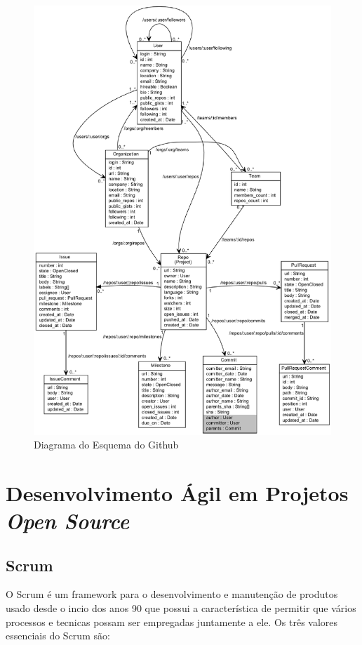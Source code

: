 \newpage
\begin{figure}[!h]
    \centering
        \includegraphics[width=\textwidth,height=\textheight,keepaspectratio=true]{figuras/gtschema.eps}
    \caption{Diagrama do Esquema do Github}
    \label{fig:github_api}
\end{figure}

\section{Desenvolvimento Ágil em Projetos \textit{Open Source}}
\label{red:des}

\subsection{Scrum}
O Scrum é um framework para o desenvolvimento e manutenção de produtos usado desde o incio dos anos 90 que possui a característica de permitir que vários processos e tecnicas possam ser empregadas juntamente a ele. Os três valores essenciais do Scrum são:

